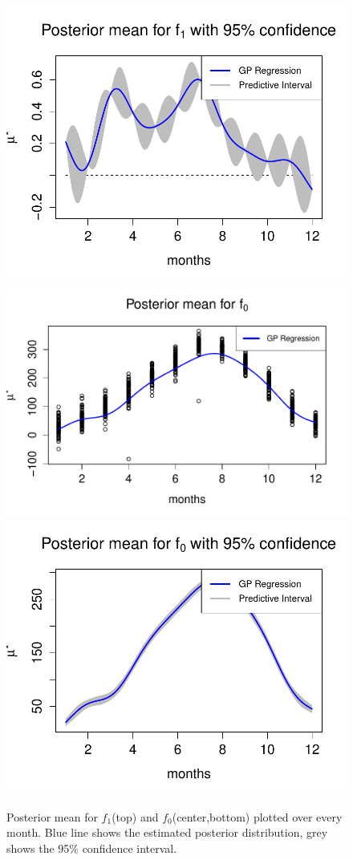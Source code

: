 \documentclass[11pt]{article}
\begin{document}
\begin{figure}[!t]
\centering
\includegraphics[width=0.7\linewidth]{p3b_1.pdf} \\
\vspace{-50pt}
\includegraphics[width=0.7\linewidth]{p3b_0.pdf} \\
\vspace{-50pt}
\includegraphics[width=0.7\linewidth]{p3b_0_1.pdf} \\
\vspace{-25pt}
\caption{Posterior mean for $f_1$(top) and $f_0$(center,bottom) plotted over every month. Blue line shows the estimated posterior distribution, grey shows the 95\% confidence interval. }
\label{fig5}
\end{figure}
\end{document}
